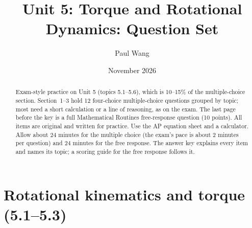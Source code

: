 \documentclass[11pt]{article}
\title{Unit 5: Torque and Rotational Dynamics: Question Set}
\author{Paul Wang}
\date{November 2026}
\begin{document}
\maketitle

\begin{abstract}
Exam-style practice on Unit 5 (topics 5.1--5.6), which is 10--15\% of the multiple-choice section. Section~1--3 hold 12 four-choice multiple-choice questions grouped by topic; most need a short calculation or a line of reasoning, as on the exam. The last page before the key is a full Mathematical Routines free-response question (10 points). All items are original and written for practice. Use the AP equation sheet and a calculator. Allow about 24 minutes for the multiple choice (the exam's pace is about 2 minutes per question) and 24 minutes for the free response. The answer key explains every item and names its topic; a scoring guide for the free response follows it.
\end{abstract}


\section{Rotational kinematics and torque (5.1--5.3)}
\end{document}
